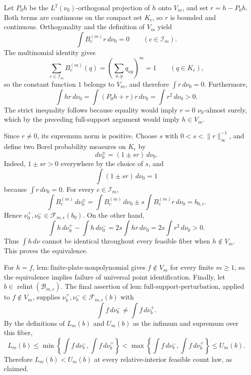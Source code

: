 Let \(P_0h\) be the \(L^2(\nu_0)\)-orthogonal projection of \(h\) onto \(V_m\), and set \(r=h-P_0h\). Both terms are continuous on the compact set \(K_{\epsilon}\), so \(r\) is bounded and continuous. Orthogonality and the definition of \(V_m\) yield
\[
\int B_c^{(m)}r\,d\nu_0=0
\qquad(c\in\mathcal I_m).
\]
The multinomial identity gives
\[
\sum_{c\in\mathcal I_m}B_c^{(m)}(q)
=\left(\sum_{a,y}q_{ay}\right)^m=1
\qquad(q\in K_{\epsilon}),
\]
so the constant function \(1\) belongs to \(V_m\), and therefore \(\int r\,d\nu_0=0\). Furthermore,
\[
\int hr\,d\nu_0
=\int (P_0h+r)r\,d\nu_0
=\int r^2\,d\nu_0>0.
\]
The strict inequality follows because equality would imply \(r=0\) \(\nu_0\)-almost surely, which by the preceding full-support argument would imply \(h\in V_m\).

Since \(r\ne0\), its supremum norm is positive. Choose \(s\) with \(0<s<\|r\|_{\infty}^{-1}\), and define two Borel probability measures on \(K_{\epsilon}\) by
\[
d\nu_0^{\pm}=(1\pm sr)\,d\nu_0.
\]
Indeed, \(1\pm sr>0\) everywhere by the choice of \(s\), and
\[
\int(1\pm sr)\,d\nu_0=1
\]
because \(\int r\,d\nu_0=0\). For every \(c\in\mathcal I_m\),
\[
\int B_c^{(m)}\,d\nu_0^{\pm}
=\int B_c^{(m)}\,d\nu_0
\pm s\int B_c^{(m)}r\,d\nu_0
=b_{0,c}.
\]
Hence \(\nu_0^+,\nu_0^-\in\mathcal F_{m,\epsilon}(b_0)\). On the other hand,
\[
\int h\,d\nu_0^+-\int h\,d\nu_0^-
=2s\int hr\,d\nu_0
=2s\int r^2\,d\nu_0>0.
\]
Thus \(\int h\,d\nu\) cannot be identical throughout every feasible fiber when \(h\notin V_m\). This proves the equivalence.

For \(h=f\), \(\mathrm{lem{:}finite\text{-}plate\text{-}nonpolynomial}\) gives \(f\notin V_m\) for every finite \(m\ge1\), so the equivalence implies failure of universal point identification. Finally, let \(b\in\operatorname{relint}(\mathcal B_{m,\epsilon})\). The final assertion of \(\mathrm{lem{:}full\text{-}support\text{-}perturbation}\), applied to \(f\notin V_m\), supplies \(\nu_b^+,\nu_b^-\in\mathcal F_{m,\epsilon}(b)\) with
\[
\int f\,d\nu_b^-\ne\int f\,d\nu_b^+.
\]
By the definitions of \(L_m(b)\) and \(U_m(b)\) as the infimum and supremum over this fiber,
\[
L_m(b)\le
\min\left\{\int f\,d\nu_b^-,\int f\,d\nu_b^+\right\}
<
\max\left\{\int f\,d\nu_b^-,\int f\,d\nu_b^+\right\}
\le U_m(b).
\]
Therefore \(L_m(b)<U_m(b)\) at every relative-interior feasible count law, as claimed.